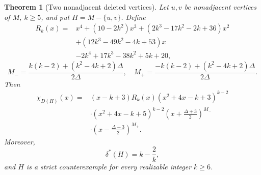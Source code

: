 \documentclass[a4paper,10pt,reqno]{amsart}
\theoremstyle{plain}
\newtheorem{theorem}{Theorem}[section]
\theoremstyle{definition}
\theoremstyle{remark}
\begin{document}
\begin{theorem}[Two nonadjacent deleted vertices]\label{thm:nonadjacent-puncture}
Let \(u,v\) be nonadjacent vertices of \(M\), \(k\ge5\), and put
\(H=M-\{u,v\}\).  Define
\begin{align*}
R_k(x)={}&x^4+(10-2k^2)x^3+(2k^3-17k^2-2k+36)x^2\\
&+(12k^3-49k^2-4k+53)x\\
&-2k^4+17k^3-38k^2+5k+20,
\end{align*}
\[
 M_- =\frac{k(k-2)+(k^2-4k+2)\Delta}{2\Delta},
 \quad
 M_+ =\frac{-k(k-2)+(k^2-4k+2)\Delta}{2\Delta}.
\]
Then
\begin{align*}
\chi_{D(H)}(x)={}&(x-k+3)R_k(x)
 (x^2+4x-k+3)^{k-2}\\
&\cdot(x^2+4x-k+5)^{k-2}
 \left(x+\frac{\Delta+3}{2}\right)^{M_-}\\
&\cdot\left(x-\frac{\Delta-3}{2}\right)^{M_+}.
\end{align*}
Moreover,
\[
 \delta^*(H)=k-\frac2k,
\]
and \(H\) is a strict counterexample for every realizable integer \(k\ge6\).
\end{theorem}
\end{document}
